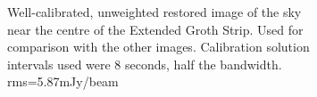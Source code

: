 \begin{figure}[h!]
\begin{subfigure}{.49\textwidth}
\caption{\label{image.3c295.goodcal-2} Well-calibrated, unweighted restored image of the sky near the centre of the Extended Groth Strip. Used for comparison with the other images. Calibration solution intervals used were 8 seconds, half the bandwidth. rms=5.87mJy/beam}
\end{subfigure}
\hfill
\begin{subfigure}{.49\textwidth}

\end{subfigure}
\end{figure}
